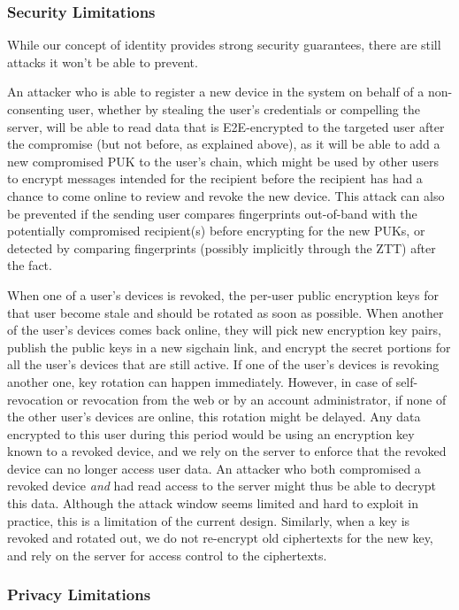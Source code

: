 \subsubsection{Security Limitations}

While our concept of identity provides strong security guarantees, there are still attacks it won't
be able to prevent.

An attacker who is able to register a new device in the system on behalf of a non-consenting user,
whether by stealing the user's credentials or compelling the server, will be able to read data that
is E2E-encrypted to the targeted user after the compromise (but not before, as explained above), as
it will be able to add a new compromised PUK to the user's chain, which might be used by other users
to encrypt messages intended for the recipient before the recipient has had a chance to come online
to review and revoke the new device. This attack can also be prevented if the sending user compares
fingerprints out-of-band with the potentially compromised recipient(s) before encrypting for the new
PUKs, or detected by comparing fingerprints (possibly implicitly through the ZTT) after the fact.

When one of a user's devices is revoked, the per-user public encryption keys for that user become
stale and should be rotated as soon as possible. When another of the user's devices comes back
online, they will pick new encryption key pairs, publish the public keys in a new sigchain link, and
encrypt the secret portions for all the user's devices that are still active. If one of the user's
devices is revoking another one, key rotation can happen immediately. However, in case of
self-revocation or revocation from the web or by an account administrator, if none of the other
user's devices are online, this rotation might be delayed. Any data encrypted to this user during
this period would be using an encryption key known to a revoked device, and we rely on the server to
enforce that the revoked device can no longer access user data. An attacker who both compromised a
revoked device \textit{and} had read access to the server might thus be able to decrypt this data.
Although the attack window seems limited and hard to exploit in practice, this is a limitation of
the current design. Similarly, when a key is revoked and rotated out, we do not re-encrypt old
ciphertexts for the new key, and rely on the server for access control to the ciphertexts.

\subsubsection{Privacy Limitations}

